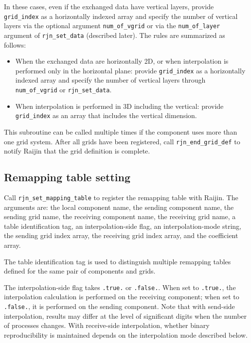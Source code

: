 \documentclass[11pt,a4paper]{report}
\begin{document}
In these cases, even if the exchanged data have vertical layers,
provide \texttt{grid\_index}
as a horizontally indexed array
and specify the number of vertical layers
via the optional argument \texttt{num\_of\_vgrid}
or via the \texttt{num\_of\_layer} argument
of \texttt{rjn\_set\_data} (described later).
The rules are summarized as follows:

\begin{itemize}
\item When the exchanged data are horizontally 2D,
  or when interpolation is performed
  only in the horizontal plane:
  provide \texttt{grid\_index}
  as a horizontally indexed array
  and specify the number of vertical layers
  through \texttt{num\_of\_vgrid} or \texttt{rjn\_set\_data}.
\item When interpolation is performed in 3D
  including the vertical:
  provide \texttt{grid\_index}
  as an array that includes the vertical dimension.
\end{itemize}

This subroutine can be called multiple times
if the component uses more than one grid system.
After all grids have been registered,
call \texttt{rjn\_end\_grid\_def}
to notify Raijin that the grid definition is complete.

\subsection{Remapping table setting}

Call \texttt{rjn\_set\_mapping\_table}
to register the remapping table with Raijin.
The arguments are:
the local component name,
the sending component name,
the sending grid name,
the receiving component name,
the receiving grid name,
a table identification tag,
an interpolation-side flag,
an interpolation-mode string,
the sending grid index array,
the receiving grid index array,
and the coefficient array.

The table identification tag is used
to distinguish multiple remapping tables
defined for the same pair of components and grids.

The interpolation-side flag
takes \texttt{.true.} or \texttt{.false.}.
When set to \texttt{.true.},
the interpolation calculation is performed
on the receiving component;
when set to \texttt{.false.},
it is performed on the sending component.
Note that with send-side interpolation,
results may differ at the level of significant digits
when the number of processes changes.
With receive-side interpolation,
whether binary reproducibility is maintained
depends on the interpolation mode described below.
\end{document}
